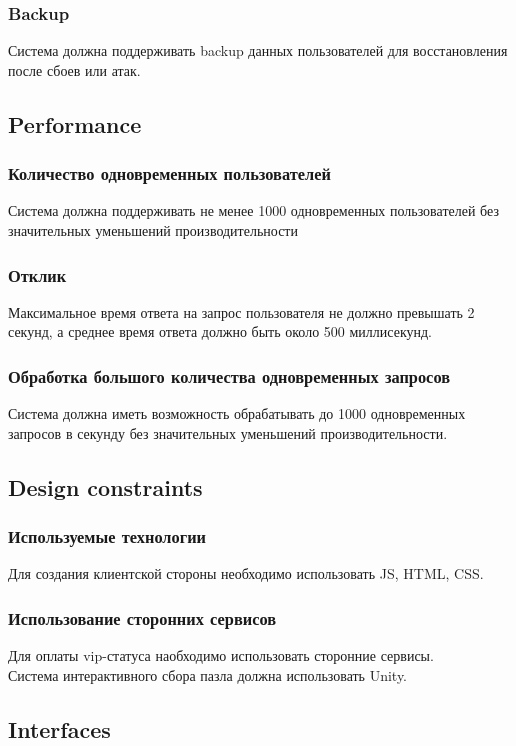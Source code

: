 \documentclass[12pt]{article}
\begin{document}
\subsubsection{Backup}
Система должна поддерживать backup данных пользователей для восстановления после сбоев или атак.
\subsection{Performance}
\subsubsection{Количество одновременных пользователей}
Система должна поддерживать не менее 1000 одновременных пользователей без значительных уменьшений производительности
\subsubsection{Отклик}
Максимальное время ответа на запрос пользователя не должно превышать 2 секунд, а среднее время ответа должно быть около 500 миллисекунд.
\subsubsection{Обработка большого количества одновременных запросов}
Система должна иметь возможность обрабатывать до 1000 одновременных запросов в секунду без значительных уменьшений производительности.
\subsection{Design constraints}
\subsubsection{Используемые технологии}
Для создания клиентской стороны необходимо использовать JS, HTML, CSS.
\subsubsection{Использование сторонних сервисов}
Для оплаты vip-статуса наобходимо использовать сторонние сервисы. \\ 
Система интерактивного сбора пазла должна использовать Unity.
\subsection{Interfaces}
\end{document}
